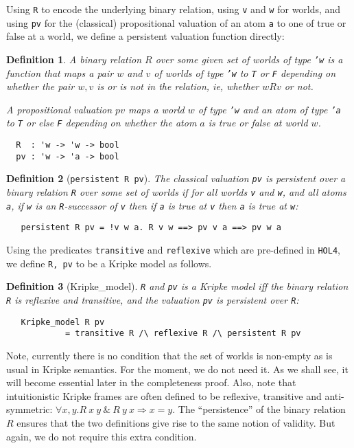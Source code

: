 \documentclass[a4paper]{article}
\newtheorem{definition}{Definition}
\newcommand{\hol}{\texttt{HOL4}}
\begin{document}
Using \texttt{R} to encode the underlying binary relation, using
\texttt{v} and \texttt{w} for worlds, and using \texttt{pv} for the
(classical) propositional valuation of an atom \texttt{a} to one of true or
false at a world, we define a persistent valuation function
directly:
\begin{definition}
 A binary relation $R$ over some given set of worlds of type
 \texttt{'w} is a function that maps a pair $w$ and $v$ of worlds
 of type \texttt{'w} to \texttt{T} or \texttt{F} depending on
 whether the pair $w,v$ is or is not in the relation,
 ie, whether $wRv$ or not.

 A propositional valuation $pv$ maps a 
 world $w$ of type \texttt{'w} and an atom of type \texttt{'a}
 to 
\texttt{T} or else \texttt{F} depending on
 whether the atom $a$ is true or false at world $w$.
\begin{verbatim}
  R  : 'w -> 'w -> bool
  pv : 'w -> 'a -> bool
\end{verbatim}
\end{definition}

\begin{definition}[\texttt{persistent R pv}]
 The classical valuation \texttt{pv} is persistent over a binary
 relation \texttt{R} over some set of worlds if for all worlds
 \texttt{v} and \texttt{w}, and all atoms \texttt{a}, 
 if \texttt{w} is an \texttt{R}-successor of \texttt{v} 
 then if \texttt{a} is true at \texttt{v} then 
 \texttt{a} is true at \texttt{w}:
\begin{verbatim}
   persistent R pv = !v w a. R v w ==> pv v a ==> pv w a
\end{verbatim}
\end{definition}

Using the predicates \texttt{transitive} and \texttt{reflexive} which
are pre-defined in \hol, we define \texttt{R, pv} to be a Kripke model
as follows.
\begin{definition}[Kripke\_model]
\texttt{R} and \texttt{pv} is a Kripke model iff 
the binary relation \texttt{R} is reflexive and
transitive, and the valuation \texttt{pv} is persistent over
\texttt{R}:
\begin{verbatim}
   Kripke_model R pv 
            = transitive R /\ reflexive R /\ persistent R pv 
\end{verbatim}
\end{definition}

Note, currently there is no condition that the set of worlds is
non-empty as is usual in Kripke semantics. For the moment, we do not
need it. As we shall see, it will become essential later in the
completeness proof. Also, note that intuitionistic Kripke frames are
often defined to be reflexive, transitive and anti-symmetric: 
$\forall x, y. R~ x~ y ~\&~ R~ y~ x \Longrightarrow x = y$. 
The ``persistence'' of the binary relation $R$ ensures that the two
definitions give rise to the same notion of validity. But again, we
do not require this extra condition.
\end{document}
